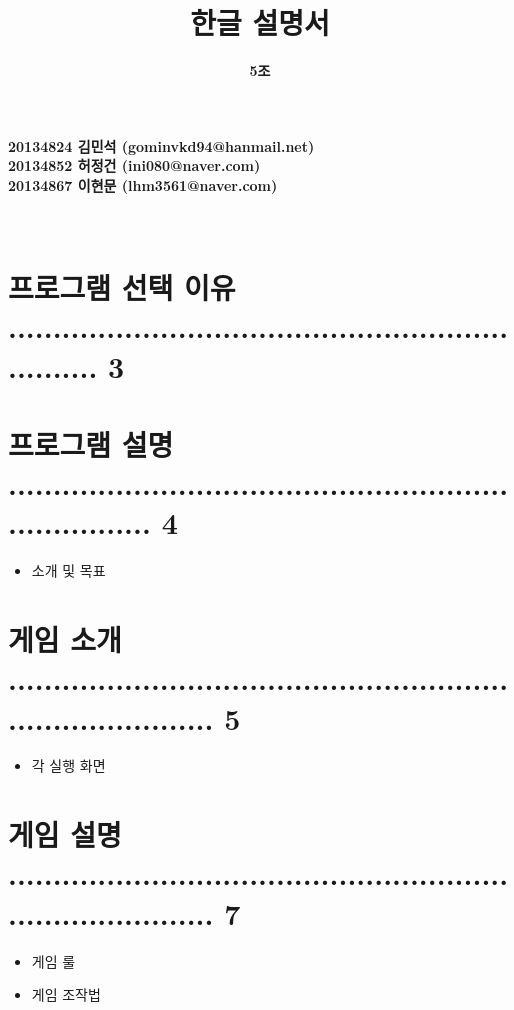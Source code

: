\documentclass[a4paper, 11pt]{article}
\title{\textbf{\Huge오목 한글 설명서}}
\author{\textbf{\LARGE5조}}
\begin{document}
	
	\maketitle
	
	\vspace{6cm}
	\begin{center}
		\textbf{\large20134824 김민석    (gominvkd94@hanmail.net)}\\
		\textbf{\large20134852 허정건    (ini080@naver.com)}\\
		\textbf{\large20134867 이현문    (lhm3561@naver.com)}\\
	\end{center}
	
	
	
	
	\maketitle
	\newpage
	\thispagestyle{empty}        
	\mbox{}
		
	\begin{center} 
		\textbf{}\\
	\end{center}
	\vspace{0.5cm}
\section{프로그램 선택 이유 .................................................................. 3}
	\vspace{0.5cm}
	\section{프로그램 설명 ........................................................................ 4}
	\begin{itemize}
		\item 소개 및 목표
	\end{itemize}
	
	\section{게임 소개 ............................................................................... 5}
		\begin{itemize}
		\item 각 실행 화면
	\end{itemize}

	
	\section{게임 설명 ............................................................................... 7}
	\begin{itemize}
		\item 게임 룰
		\item 게임 조작법
	\end{itemize}
	
\end{document}
